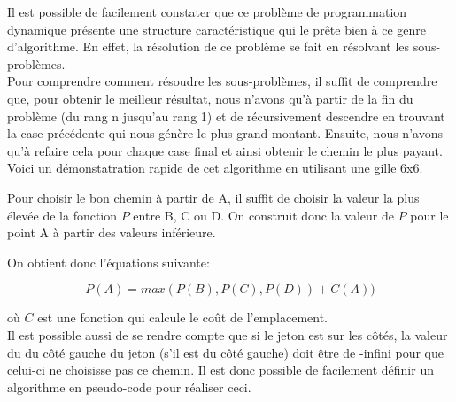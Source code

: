 \documentclass[devoir3.tex]{subfiles}
\begin{document}
Il est possible de facilement constater que ce problème de programmation dynamique présente une structure caractéristique qui le prête bien à ce genre d'algorithme. En effet, la résolution de ce problème se fait en résolvant les sous-problèmes.\\

Pour comprendre comment résoudre les sous-problèmes, il suffit de comprendre que, pour obtenir le meilleur résultat, nous n'avons qu'à partir de la fin du problème (du rang n jusqu'au rang 1) et de récursivement descendre en trouvant la case précédente qui nous génère le plus grand montant. Ensuite, nous n'avons qu'à refaire cela pour chaque case final et ainsi obtenir le chemin le plus payant.\\

Voici un démonstatration rapide de cet algorithme en utilisant une gille 6x6.\\


Pour choisir le bon chemin à partir de A, il suffit de choisir la valeur la plus élevée de la fonction \( P \) entre B, C ou D. On construit donc la valeur de \( P \) pour le point A à partir des valeurs inférieure.

On obtient donc l'équations suivante:

\[ P(A) = max(P(B), P(C), P(D)) + C(A)) \]

où \( C \) est une fonction qui calcule le coût de l'emplacement.\\

Il est possible aussi de se rendre compte que si le jeton est sur les côtés, la valeur du du côté gauche du jeton (s'il est du côté gauche) doit être de -infini pour que celui-ci ne choisisse pas ce chemin. Il est donc possible de facilement définir un algorithme en pseudo-code pour réaliser ceci.\\
\end{document}
